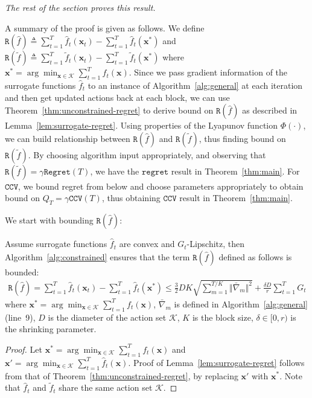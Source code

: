 \documentclass[twoside,11pt,]{article}
\newcommand{\C}[1]{\mathcal{#1}}
\newcommand{\BF}[1]{\mathbf{#1}}
\newcommand{\K}{\C{K}}
\newcommand{\x}{\BF{x}}
\newcommand{\tf}{\tilde{f}}
\newcommand{\tft}{\tilde{f}_t}
\newcommand{\hf}{\hat{f}}
\newcommand{\hft}{\hat{f}_t}
\newcommand{\sumT}{\sum\limits_{t=1}^T}
\newcommand{\bn}{\bar{\nabla}}
\begin{document}
\emph{The rest of the section proves this result.}

A summary of the proof is given as follows. We define $\mathtt{R}(\hf) \triangleq \sum_{t=1}^T \hf_t(\x_t) - \sum_{t=1}^T \hf_t(\x^*)$ and $\mathtt{R}(\tf) \triangleq \sum_{t=1}^T \tf_t(\x_t) - \sum_{t=1}^T \tf_t(\x^*)$ where $\x^*=\arg\min_{\x\in\K}\sum_{t=1}^T f_t(\x)$. 
Since we pass gradient information of the surrogate functions $\hat{f}_t$ to an instance of Algorithm~\ref{alg:general} at each iteration and then get updated actions back at each block, we can use Theorem~\ref{thm:unconstrained-regret} to derive bound on $\mathtt{R}(\hf)$ as described in Lemma~\ref{lem:surrogate-regret}. 
Using properties of the Lyapunov function $\Phi(\cdot)$, we can build relationship between $\mathtt{R}(\hf)$ and $\mathtt{R}(\tf)$, thus finding bound on $\mathtt{R}(\tf)$. 
By choosing algorithm input appropriately, and observing that $\mathtt{R}(\tf)=\gamma \mathtt{Regret}(T)$, we have the $\mathtt{regret}$ result in Theorem~\ref{thm:main}. 
For $\mathtt{CCV}$, we bound regret from below and choose parameters appropriately to obtain bound on $Q_T=\gamma \mathtt{CCV}(T)$, thus obtaining $\mathtt{CCV}$ result in Theorem~\ref{thm:main}.

We start with bounding $\mathtt{R}(\hf)$:
\begin{lemma}
\label{lem:surrogate-regret}
Assume surrogate functions $\hf_t$ are convex and $G_t$-Lipschitz, then Algorithm~\ref{alg:constrained} ensures that the term $\mathtt{R}(\hf)$ defined as follows is bounded:
\begin{align*}
    \mathtt{R}(\hf) = \sum_{t=1}^T \hf_t(\x_t) - \sum_{t=1}^T \hf_t(\x^*)
    \leq \frac{3}{2}DK\sqrt{\sum_{m=1}^{T/K} \Vert \bn_m \Vert ^2} + \frac{\delta D}{r} \sumT G_t
\end{align*}
where $\x^*=\arg\min_{\x\in\K}\sum_{t=1}^T f_t(\x)$, $\bn_m$ is defined in Algorithm~\ref{alg:general}(line~9), $D$ is the diameter of the action set $\K$, $K$ is the block size, $\delta \in [0,r)$ is the shrinking parameter.
\end{lemma}
\begin{proof}
    Let $\x^*=\arg\min_{\x\in\K}\sum_{t=1}^T f_t(\x)$ and $\x'=\arg\min_{\x\in\K}\sum_{t=1}^T \hf_t(\x)$.
    Proof of Lemma~\ref{lem:surrogate-regret} follows from that of Theorem~\ref{thm:unconstrained-regret}, by replacing $\x'$ with $\x^*$. Note that $\hft$ and $\tft$ share the same action set $\K$.
\end{proof}
\end{document}

